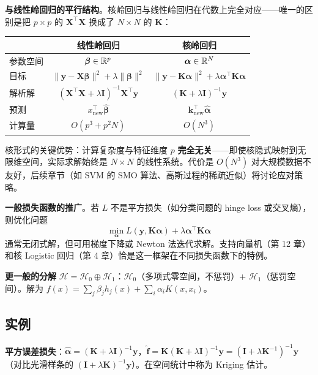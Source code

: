 \textbf{与线性岭回归的平行结构}。核岭回归与线性岭回归在代数上完全对应——唯一的区别是把 $p \times p$ 的 $\mathbf{X}^\top\mathbf{X}$ 换成了 $N \times N$ 的 $\mathbf{K}$：
\begin{center}
\begin{tabular}{lcc}
\toprule
& 线性岭回归 & 核岭回归 \\
\midrule
参数空间 & $\boldsymbol{\beta} \in \mathbb{R}^p$ & $\boldsymbol{\alpha} \in \mathbb{R}^N$ \\
目标 & $\|\mathbf{y} - \mathbf{X}\boldsymbol{\beta}\|^2 + \lambda\|\boldsymbol{\beta}\|^2$ & $\|\mathbf{y} - \mathbf{K}\boldsymbol{\alpha}\|^2 + \lambda\boldsymbol{\alpha}^\top\mathbf{K}\boldsymbol{\alpha}$ \\
解析解 & $(\mathbf{X}^\top\mathbf{X} + \lambda\mathbf{I})^{-1}\mathbf{X}^\top\mathbf{y}$ & $(\mathbf{K} + \lambda\mathbf{I})^{-1}\mathbf{y}$ \\
预测 & $x_{\text{new}}^\top \hat{\boldsymbol{\beta}}$ & $\mathbf{k}_{\text{new}}^\top \hat{\boldsymbol{\alpha}}$ \\
计算量 & $O(p^3 + p^2 N)$ & $O(N^3)$ \\
\bottomrule
\end{tabular}
\end{center}
核形式的关键优势：计算复杂度与特征维度 $p$ \textbf{完全无关}——即使核隐式映射到无限维空间，实际求解始终是 $N \times N$ 的线性系统。代价是 $O(N^3)$ 对大规模数据不友好，后续章节（如 SVM 的 SMO 算法、高斯过程的稀疏近似）将讨论应对策略。

\textbf{一般损失函数的推广}。若 $L$ 不是平方损失（如分类问题的 hinge loss 或交叉熵），则优化问题
\[
\min_{\boldsymbol{\alpha}} L(\mathbf{y}, \mathbf{K}\boldsymbol{\alpha}) + \lambda \boldsymbol{\alpha}^\top\mathbf{K}\boldsymbol{\alpha}
\]
通常无闭式解，但可用梯度下降或 Newton 法迭代求解。支持向量机（第 12 章）和核 Logistic 回归（第 4 章）恰是这一框架在不同损失函数下的特例。

\textbf{更一般的分解} $\mathcal{H} = \mathcal{H}_0 \oplus \mathcal{H}_1$：$\mathcal{H}_0$（多项式零空间，不惩罚）$+$ $\mathcal{H}_1$（惩罚空间）。解为 $f(x) = \sum_{j} \beta_j h_j(x) + \sum_{i} \alpha_i K(x, x_i)$。

\subsection{实例}

\textbf{平方误差损失}：$\hat{\boldsymbol{\alpha}} = (\mathbf{K} + \lambda\mathbf{I})^{-1}\mathbf{y}$，$\hat{\mathbf{f}} = \mathbf{K}(\mathbf{K} + \lambda\mathbf{I})^{-1}\mathbf{y} = (\mathbf{I} + \lambda\mathbf{K}^{-1})^{-1}\mathbf{y}$（对比光滑样条的 $(\mathbf{I}+\lambda\mathbf{K})^{-1}\mathbf{y}$）。在空间统计中称为 Kriging 估计。

